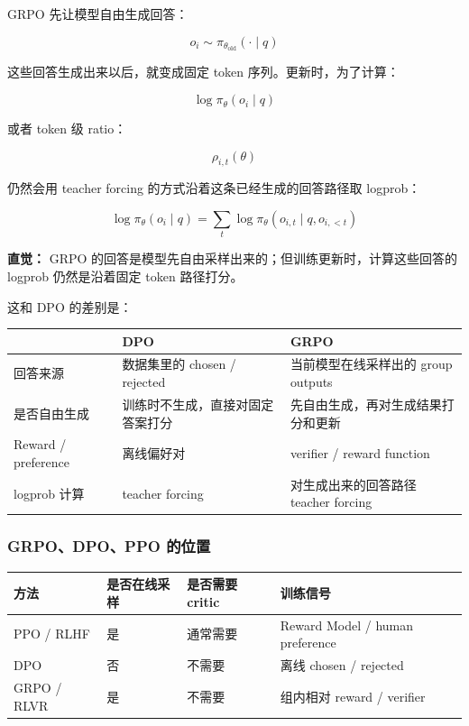 GRPO 先让模型自由生成回答：

\[
o_i \sim \pi_{\theta_\text{old}}(\cdot \mid q)
\]

这些回答生成出来以后，就变成固定 token 序列。更新时，为了计算：

\[
\log \pi_\theta(o_i \mid q)
\]

或者 token 级 ratio：

\[
\rho_{i,t}(\theta)
\]

仍然会用 teacher forcing 的方式沿着这条已经生成的回答路径取 logprob：

\[
\log \pi_\theta(o_i \mid q)
=
\sum_t
\log \pi_\theta(o_{i,t} \mid q, o_{i,<t})
\]

\begin{intubox}
\textbf{直觉：} GRPO 的回答是模型先自由采样出来的；但训练更新时，计算这些回答的 logprob 仍然是沿着固定 token 路径打分。
\end{intubox}

这和 DPO 的差别是：

\begin{center}
{\small
\begin{tabular}{p{3cm}p{4.8cm}p{4.8cm}}
\hline
 & \textbf{DPO} & \textbf{GRPO} \\
\hline
回答来源 & 数据集里的 chosen / rejected & 当前模型在线采样出的 group outputs \\
是否自由生成 & 训练时不生成，直接对固定答案打分 & 先自由生成，再对生成结果打分和更新 \\
Reward / preference & 离线偏好对 & verifier / reward function \\
logprob 计算 & teacher forcing & 对生成出来的回答路径 teacher forcing \\
\hline
\end{tabular}
}
\end{center}

\subsubsection{GRPO、DPO、PPO 的位置}

\begin{center}
{\small
\begin{tabular}{p{2.4cm}p{3.5cm}p{3.5cm}p{3.4cm}}
\hline
\textbf{方法} & \textbf{是否在线采样} & \textbf{是否需要 critic} & \textbf{训练信号} \\
\hline
PPO / RLHF & 是 & 通常需要 & Reward Model / human preference \\
DPO & 否 & 不需要 & 离线 chosen / rejected \\
GRPO / RLVR & 是 & 不需要 & 组内相对 reward / verifier \\
\hline
\end{tabular}
}
\end{center}

